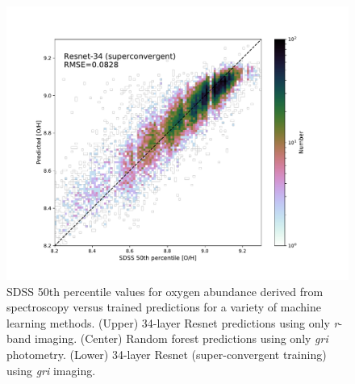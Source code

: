 \documentclass[fleqn,usenatbib]{mnras}
\begin{document}
\begin{figure}
	\includegraphics[width=\columnwidth]{superconvergent-resnet34_pred-vs-SDSS.pdf}
	\caption{\label{prediction-truth-plots}
		SDSS 50th percentile values for oxygen abundance derived from spectroscopy versus trained predictions for a variety of machine learning methods.
		(Upper) 34-layer Resnet predictions using only \textit{r}-band imaging.
		(Center) Random forest predictions using only \textit{gri} photometry.
		(Lower) 34-layer Resnet (super-convergent training) using \textit{gri} imaging.
		}
\end{figure}


\end{document}
